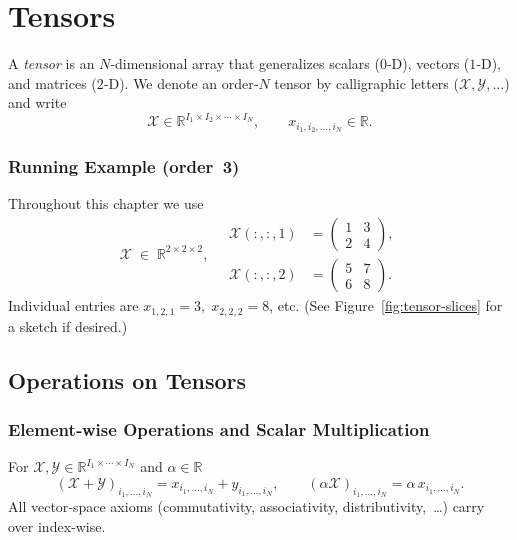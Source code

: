 \section{Tensors}

\noindent
A \emph{tensor} is an $N$‑dimensional array that generalizes
scalars ($0$‑D), vectors ($1$‑D), and matrices ($2$‑D).
We denote an order‑$N$ tensor by calligraphic letters
($\mathcal{X},\mathcal{Y},\dots$)
and write
\[
  \mathcal{X}\in\mathbb{R}^{I_1\times I_2\times\cdots\times I_N},
  \qquad
  x_{i_1,i_2,\dots,i_N}\in\mathbb{R}.
\]

\subsubsection*{Running Example (order 3)}  
Throughout this chapter we use
\[
\mathcal{X}\;\in\;\mathbb{R}^{2\times2\times2},
\quad
\begin{aligned}
\mathcal{X}(:,:,1)&=\begin{pmatrix} 1 & 3 \\ 2 & 4 \end{pmatrix},
\\[4pt]
\mathcal{X}(:,:,2)&=\begin{pmatrix} 5 & 7 \\ 6 & 8 \end{pmatrix}.
\end{aligned}
\]
Individual entries are
$x_{1,2,1}=3,\;x_{2,2,2}=8$, etc.
(See Figure~\ref{fig:tensor-slices} for a sketch if desired.)


\subsection{Operations on Tensors}
\subsubsection{Element‑wise Operations and Scalar Multiplication}
For $\mathcal{X},\mathcal{Y}\in\mathbb{R}^{I_1\times\cdots\times I_N}$
and $\alpha\in\mathbb{R}$
\[
(\mathcal{X}+\mathcal{Y})_{i_1,\dots,i_N}=x_{i_1,\dots,i_N}+y_{i_1,\dots,i_N},
\qquad
(\alpha\mathcal{X})_{i_1,\dots,i_N}=\alpha\,x_{i_1,\dots,i_N}.
\]
All vector‑space axioms
(commutativity, associativity, distributivity, …) carry over index‑wise.

